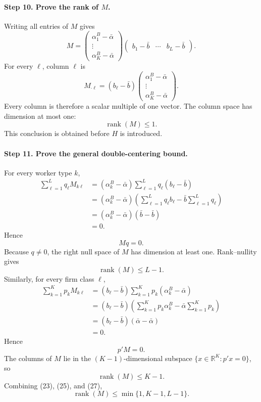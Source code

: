 \documentclass[11pt]{article}
\newcommand{\rank}{\operatorname{rank}}
\begin{document}
\paragraph{Step 10. Prove the rank of \(M\).}

Writing all entries of \(M\) gives
\[
M
=
\begin{pmatrix}
\alpha_1^B-\bar\alpha\\
\vdots\\
\alpha_K^B-\bar\alpha
\end{pmatrix}
\begin{pmatrix}
b_1-\bar b&\cdots&b_L-\bar b
\end{pmatrix}.
\tag{21}
\]
For every \(\ell\), column \(\ell\) is
\[
M_{\cdot\ell}
=
(b_\ell-\bar b)
\begin{pmatrix}
\alpha_1^B-\bar\alpha\\
\vdots\\
\alpha_K^B-\bar\alpha
\end{pmatrix}.
\tag{22}
\]
Every column is therefore a scalar multiple of one vector.  The column space
has dimension at most one:
\[
\rank(M)\leq1.
\tag{23}
\]
This conclusion is obtained before \(H\) is introduced.

\paragraph{Step 11. Prove the general double-centering bound.}

For every worker type \(k\),
\begin{align*}
\sum_{\ell=1}^Lq_\ell M_{k\ell}
&=
(\alpha_k^B-\bar\alpha)
\sum_{\ell=1}^Lq_\ell(b_\ell-\bar b)\\
&=
(\alpha_k^B-\bar\alpha)
\left(
\sum_{\ell=1}^Lq_\ell b_\ell
-
\bar b\sum_{\ell=1}^Lq_\ell
\right)\\
&=
(\alpha_k^B-\bar\alpha)(\bar b-\bar b)\\
&=0.
\end{align*}
Hence
\[
Mq=0.
\tag{24}
\]
Because \(q\neq0\), the right null space of \(M\) has dimension at least one.
Rank--nullity gives
\[
\rank(M)\leq L-1.
\tag{25}
\]
Similarly, for every firm class \(\ell\),
\begin{align*}
\sum_{k=1}^Kp_kM_{k\ell}
&=
(b_\ell-\bar b)
\sum_{k=1}^Kp_k(\alpha_k^B-\bar\alpha)\\
&=
(b_\ell-\bar b)
\left(
\sum_{k=1}^Kp_k\alpha_k^B
-
\bar\alpha\sum_{k=1}^Kp_k
\right)\\
&=
(b_\ell-\bar b)(\bar\alpha-\bar\alpha)\\
&=0.
\end{align*}
Hence
\[
p'M=0.
\tag{26}
\]
The columns of \(M\) lie in the \((K-1)\)-dimensional subspace
\(\{x\in\mathbb R^K:p'x=0\}\), so
\[
\rank(M)\leq K-1.
\tag{27}
\]
Combining (23), (25), and (27),
\[
\rank(M)\leq\min\{1,K-1,L-1\}.
\tag{28}
\]
\end{document}
